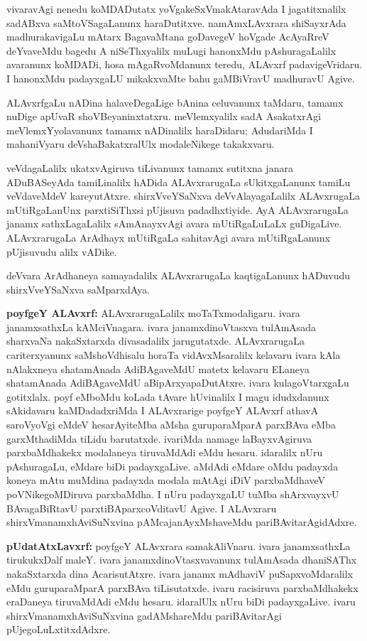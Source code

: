 vivaravAgi nenedu koMDADutatx yoVgakeSxVmakAtaravAda I jagatitxnalilx sadABxva saMtoVSagaLanunx haraDutitxve. namAmxLAvxrara shiSayxrAda madhurakavigaLu mAtarx BagavaMtana goDavegeV hoVgade AcAyaRreV deYvaveMdu bagedu A niSeThxyalilx muLugi hanonxMdu pAshuragaLalilx avaranunx koMDADi, hosa mAgaRvoMdanunx teredu, ALAvxrf padavigeVridaru. I hanonxMdu padayxgaLU mikakxvaMte bahu gaMBiVravU madhuravU Agive.

ALAvxrfgaLu nADina halaveDegaLige bAnina celuvanunx taMdaru, tamamx nuDige apUvaR shoVBeyaninxtatxru. meVlemxyalilx sadA AsakatxrAgi meVlemxYyolavanunx tamamx nADinalilx haraDidaru; AdudariMda I mahaniVyaru deVshaBakatxralUlx modaleNikege takakxvaru.

veVdagaLalilx ukatxvAgiruva tiLivanunx tamamx sutitxna janara ADuBASeyAda tamiLinalilx hADida ALAvxrarugaLa sUkitxgaLanunx tamiLu veVdaveMdeV kareyutAtxre. shirxVveYSaNxva deVvAlayagaLalilx ALAvxrugaLa mUtiRgaLanUnx parxtiSiThxsi pUjisuva padadhxti\-yide. AyA ALAvxrarugaLa janamx sathxLagaLalilx sAmAnayxvAgi avara mUtiRgaLuLaLx guDigaLive. ALAvxrarugaLa ArAdhayx mUtiRgaLa sahitavAgi avara mUtiRgaLanunx pUjisuvudu alilx vADike.

deVvara ArAdhaneya samayadalilx ALAvxrarugaLa kaqtigaLanunx hADuvudu shirxVveYSaNxva saMparxdAya.

{\textbf {poyfgeY ALAvxrf:}} ALAvxrarugaLalilx moTaTxmodaligaru. ivara janamxsathxLa kAMciVnagara. ivara janamxdinoVtasxva tulAmAsada sharxvaNa nakaSxtarxda divasadalilx jarugutatxde. ALAvxrarugaLa cariterxyanunx saMshoVdhisalu horaTa vidAvxMsaralilx kelavaru ivara kAla nAlakxneya shatamAnada AdiBAgaveMdU matetx kelavaru ELaneya shatamAnada AdiBAgaveMdU aBipArxyapaDutAtxre. ivara kulagoVtarxgaLu gotitxlalx. poyf eMboMdu koLada tAvare hUvinalilx I magu idudxdanunx sAkidavaru kaMDadadxriMda I ALAvxrarige poyfgeY ALAvxrf athavA saroVyoVgi eMdeV hesarAyiteMba aMsha guruparaMparA parxBAva eMba garxMthadiMda tiLidu barutatxde. ivariMda namage laBayxvAgiruva parxbaMdhakekx modalaneya tiruvaMdAdi eMdu hesaru. idaralilx nUru pAshuragaLu, eMdare biDi padayxgaLive. aMdAdi eMdare oMdu padayxda koneya mAtu muMdina padayxda modala mAtAgi iDiV parxbaMdhaveV poVNikegoMDiruva parxbaMdha. I nUru padayxgaLU tuMba shArxvayxvU BAvagaBiRtavU parxtiBAparxcoVditavU Agive. I ALAvxraru shirxVmanamxhAviSuNxvina pAMcajanAyxMshaveMdu pariBAvitarAgidAdxre.

{\large\textbf {pUdatAtxLavxrf:}} poyfgeY ALAvxrara samakAliVnaru. ivara janamxsathxLa tirukukxDalf maleY. ivara janamxdinoVtasxvavanunx tulAmAsada dhaniSAThx nakaSxtarxda dina AcarisutAtxre. ivara janamx mAdhaviV puSapxvoMdaralilx eMdu guruparaMparA parxBAva tiLisutatxde. ivaru racisiruva parxbaMdhakekx eraDaneya tiruvaMdAdi eMdu hesaru. idaralUlx nUru biDi padayxgaLive. ivaru shirxVmanamxhAviSuNxvina gadAMshareMdu pariBAvitarAgi pUjegoLuLxtitxdAdxre.

